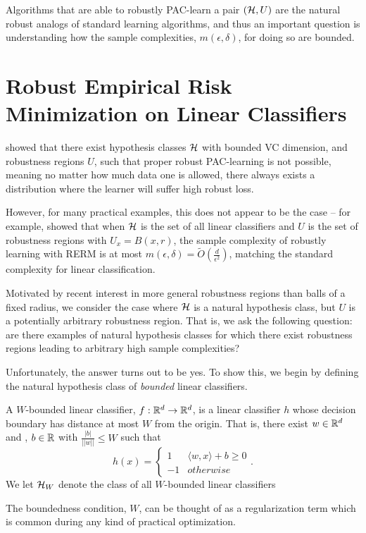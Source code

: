 Algorithms that are able to robustly PAC-learn a pair $(\mathcal H, U)$ are the natural robust analogs of standard learning algorithms, and thus an important question is understanding how the sample complexities, $m(\epsilon, \delta)$, for doing so are bounded.

\section{Robust Empirical Risk Minimization on Linear Classifiers}

\citet{Srebro19} showed that there exist hypothesis classes $\mathcal H$ with bounded VC dimension, and robustness regions $U$, such that proper robust PAC-learning is not possible, meaning no matter how much data one is allowed, there always exists a distribution where the learner will suffer high robust loss.

However, for many practical examples, this does not appear to be the case -- for example, \cite{Cullina18} showed that when $\mathcal H$ is the set of all linear classifiers and $U$ is the set of robustness regions with $U_x = B(x, r)$, the sample complexity of robustly learning with RERM is at most $m(\epsilon, \delta) = \tilde{O}\left(\frac{d}{\epsilon^2}\right)$, matching the standard complexity for linear classification. 

Motivated by recent interest in more general robustness regions than balls of a fixed radius, we consider the case where $\mathcal H$ is a natural hypothesis class, but $U$ is a potentially arbitrary robustness region. That is, we ask the following question: are there examples of natural hypothesis classes for which there exist robustness regions leading to arbitrary high sample complexities?

Unfortunately, the answer turns out to be yes. To show this, we begin by defining the natural hypothesis class of \textit{bounded} linear classifiers.
\begin{defn}\label{defn:bounded_linear}
A $W$-bounded linear classifier, $f: \mathbb{R}^d \to \mathbb{R}^d$, is a linear classifier $h$ whose decision boundary has distance at most $W$ from the origin. That is, there exist $w \in \mathbb{R}^d$ and , $b\in \mathbb{R}$ with $\frac{|b|}{||w||} \leq W$ such that $$h(x) = \begin{cases}1 & \langle w, x \rangle + b \geq 0 \\ -1 & otherwise \end{cases}.$$ We let $\mathcal H_W$ denote the class of all $W$-bounded linear classifiers
\end{defn}
The boundedness condition, $W$, can be thought of as a regularization term which is common during any kind of practical optimization.

